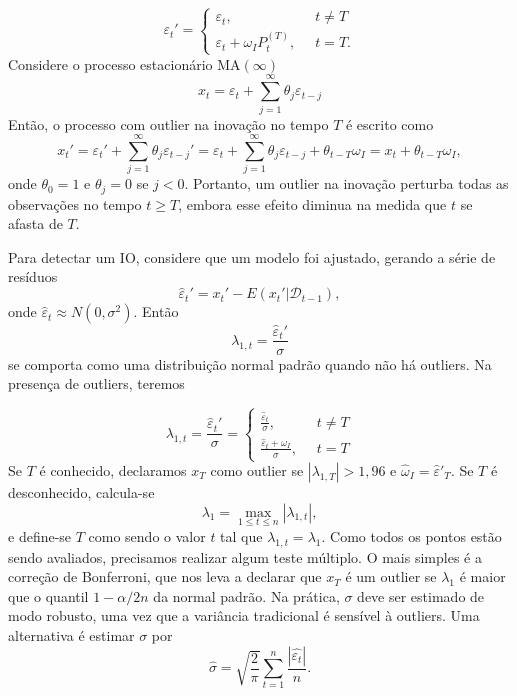 \documentclass[
  letterpaper,
  DIV=11,
  numbers=noendperiod]{scrartcl}
\theoremstyle{plain}
\theoremstyle{plain}
\theoremstyle{definition}
\theoremstyle{definition}
\theoremstyle{remark}
\begin{document}
\[\varepsilon_t'=\left\{\begin{array}{ll}\varepsilon_t,&\;\;t\neq T\\ \varepsilon_t+\omega_I P_t^{(T)},&\;\;t=T.\end{array}\right.\]
Considere o processo estacionário MA\((\infty)\)
\[x_t=\varepsilon_t+\sum_{j=1}^\infty \theta_j\varepsilon_{t-j}\] Então,
o processo com outlier na inovação no tempo \(T\) é escrito como
\[x_t'=\varepsilon_t'+\sum_{j=1}^\infty \theta_j\varepsilon_{t-j}'=\varepsilon_t+\sum_{j=1}^\infty \theta_j\varepsilon_{t-j}+\theta_{t-T}\omega_I=x_t+\theta_{t-T}\omega_I,\]
onde \(\theta_0=1\) e \(\theta_j=0\) se \(j<0\). Portanto, um outlier na
inovação perturba todas as observações no tempo \(t\geq T\), embora esse
efeito diminua na medida que \(t\) se afasta de \(T\).

Para detectar um IO, considere que um modelo foi ajustado, gerando a
série de resíduos
\[\hat{\varepsilon}_t'=x_t'-E(x_t'|\mathcal{D}_{t-1}),\] onde
\(\hat{\varepsilon}_t\approx N(0,\sigma^2)\). Então
\[\lambda_{1,t}=\frac{\hat{\varepsilon}_t'}{\sigma}\] se comporta como
uma distribuição normal padrão quando não há outliers. Na presença de
outliers, teremos

\[\lambda_{1,t}=\frac{\hat{\varepsilon}_t'}{\sigma}=\left\{\begin{array}{ll}\frac{\hat{\varepsilon}_t}{\sigma},&\;\; t\neq T\\ \frac{\hat{\varepsilon}_t+\omega_I}{\sigma},&\;\; t= T\end{array}\right.\]
Se \(T\) é conhecido, declaramos \(x_T\) como outlier se
\(|\lambda_{1,T}|>1,96\) e \(\hat{\omega}_I=\hat{\varepsilon}'_T\). Se
\(T\) é desconhecido, calcula-se
\[\lambda_1=\max_{1\leq t \leq n}|\lambda_{1,t}|,\] e define-se \(T\)
como sendo o valor \(t\) tal que \(\lambda_{1,t}=\lambda_1\). Como todos
os pontos estão sendo avaliados, precisamos realizar algum teste
múltiplo. O mais simples é a correção de Bonferroni, que nos leva a
declarar que \(x_T\) é um outlier se \(\lambda_1\) é maior que o quantil
\(1-\alpha/2n\) da normal padrão. Na prática, \(\sigma\) deve ser
estimado de modo robusto, uma vez que a variância tradicional é sensível
à outliers. Uma alternativa é estimar \(\sigma\) por
\[\hat{\sigma}=\sqrt{\frac{2}{\pi}}\sum_{t=1}^n\frac{|\hat{\varepsilon_t}|}{n}.\]
\end{document}
